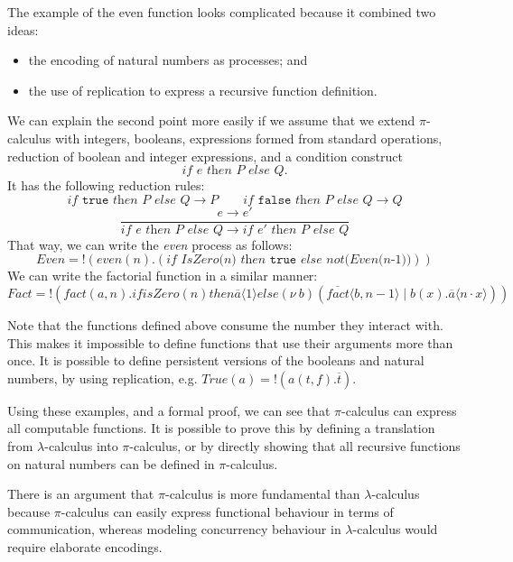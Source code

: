 \documentclass[a4paper, openany]{memoir}
\theoremstyle{definition}
\begin{document}
    The example of the even function looks complicated because it combined two ideas:
    \begin{itemize}
        \item the encoding of natural numbers as processes; and
        \item the use of replication to express a recursive function definition.
    \end{itemize}
    We can explain the second point more easily if we assume that we extend $\pi$-calculus with integers, booleans, expressions formed from standard operations, reduction of boolean and integer expressions, and a condition construct
    \[\textit{if } e \textit{ then } P \textit{ else } Q.\]
    It has the following reduction rules:
    \[\textit{if } \texttt{true} \textit{ then } P \textit{ else } Q \to P \qquad \textit{if } \texttt{false} \textit{ then } P \textit{ else } Q \to Q \]
    \[\frac{e \to e'}{\textit{if } e \textit{ then } P \textit{ else } Q \to \textit{if } e' \textit{ then } P \textit{ else } Q}\]
    That way, we can write the \textit{even} process as follows:
    \[\textit{Even} = !(
        \textit{even}(n).(\textit{if IsZero(n) then }\texttt{true} \textit{ else not(Even(n-1))})
    )\]
    We can write the factorial function in a similar manner:
    \[\textit{Fact} = !(
        \textit{fact}(a, n).if isZero(n) then \overline{a} \langle 1 \rangle 
        else (\nu \ b)(\overline{fact} \langle b, n-1 \rangle \mid b(x).\overline{a} \langle n \cdot x \rangle)
    )\]

    Note that the functions defined above consume the number they interact with. This makes it impossible to define functions that use their arguments more than once. It is possible to define persistent versions of the booleans and natural numbers, by using replication, e.g. $\textit{True}(a) = !(a(t, f).\overline{t})$.

    Using these examples, and a formal proof, we can see that $\pi$-calculus can express all computable functions. It is possible to prove this by defining a translation from $\lambda$-calculus into $\pi$-calculus, or by directly showing that all recursive functions on natural numbers can be defined in $\pi$-calculus.

    There is an argument that $\pi$-calculus is more fundamental than $\lambda$-calculus because $\pi$-calculus can easily express functional behaviour in terms of communication, whereas modeling concurrency behaviour in $\lambda$-calculus would require elaborate encodings.
\end{document}
